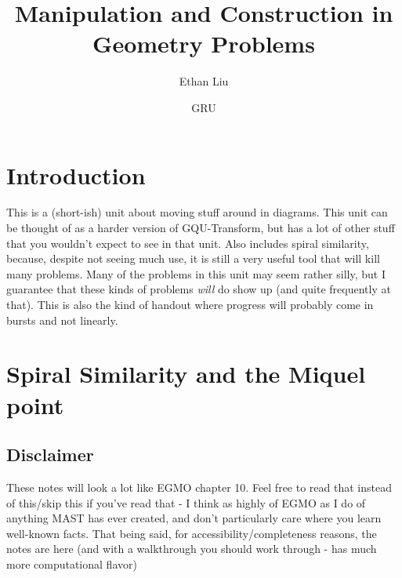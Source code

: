 \documentclass[mast]{lucky}
\begin{document}
\title{Manipulation and Construction in Geometry Problems}
\author{Ethan Liu}
\date{GRU}
\maketitle
\section{Introduction}
This is a (short-ish) unit about moving stuff around in diagrams. This unit can be thought of as a harder version of GQU-Transform, but has a lot of other stuff that you wouldn't expect to see in that unit. Also includes spiral similarity, because, despite not seeing much use, it is still a very useful tool that will kill many problems.
Many of the problems in this unit may seem rather silly, but I guarantee that these kinds of problems \textit{will} do show up (and quite frequently at that). This is also the kind of handout where progress will probably come in bursts and not linearly.
\section{Spiral Similarity and the Miquel point}
\subsection{Disclaimer}
These notes will look a lot like EGMO chapter 10. Feel free to read that instead of this/skip this if you've read that - I think as highly of EGMO as I do of anything MAST has ever created, and don't particularly care where you learn well-known facts. That being said, for accessibility/completeness reasons, the notes are here (and with a walkthrough you should work through - has much more computational flavor) 
\end{document}
